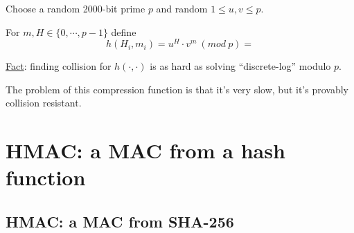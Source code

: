 \documentclass[12pt]{book}
\begin{document}
Choose a random 2000-bit prime $p$ and random $1\leq u,v\leq p$.

For $m,H\in\{0,\cdots,p-1\}$ define $$h(H_{i},m_{i})=u^{H}\cdot v^{m}\ (mod\ p)=$$

\underline{Fact}: finding collision for $h(\cdot,\cdot)$ is as hard as solving ``discrete-log'' modulo $p$.

The problem of this compression function is that it's very slow, but it's provably collision resistant.

\newpage
\section{HMAC: a MAC from a hash function}
\subsection{HMAC: a MAC from SHA-256}
\end{document}
